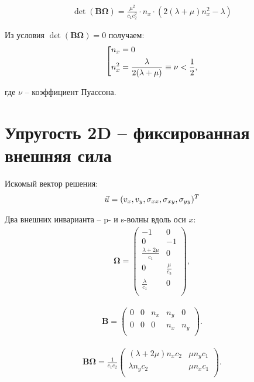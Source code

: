 \begin{eqnarray}
	\det (\mathbf{B} \mathbf{\Omega}) = \frac{\mu^{2}}{c_1 c^2_2} \cdot n_x \cdot (2 (\lambda + \mu) n^2_x - \lambda)
\end{eqnarray}

Из условия $\det (\mathbf{B} \mathbf{\Omega}) = 0$ получаем:
\begin{eqnarray}
\left[
\begin{gathered} 
	 n_x = 0  \hfill  \\
	 n^2_x = \frac{\lambda}{2(\lambda + \mu)} \equiv \nu < \frac{1}{2}, \hfill  \\
\end{gathered} 
\right.
\end{eqnarray}

где $\nu$ -- коэффициент Пуассона.


\section{Упругость 2D -- фиксированная внешняя сила}
Искомый вектор решения:
\begin{eqnarray}
	\vec{u}=(v_x,v_y,\sigma_{xx},\sigma_{xy},\sigma_{yy})^{\small{T}}
\end{eqnarray}

Два внешних инварианта -- p- и s-волны вдоль оси $x$:
\begin{align}
\label{outer_waves_elastic2d}
	\mathbf{\Omega} =
	\left( \begin{array}{cccccccccccc}
	-1 & 0   \\
	 0 & -1  \\
	\frac{\lambda+2\mu}{c_1} & 0 \\
	0 & \frac{\mu}{c_2} \\
	\frac{\lambda}{c_1} & 0 \\
	\end{array} \right),
\end{align} 

\begin{align}
	\mathbf{B} =
	\left( \begin{array}{cccccccccccc}
	 0 & 0 & n_x & n_y & 0 \\
	 0 & 0 & 0 & n_x & n_y \\
	\end{array} \right).
\end{align}

\begin{align}
	\mathbf{B} \mathbf{\Omega} = \frac{1}{c_1 c_2}
	\left( \begin{array}{cccccccccccc}
	 (\lambda + 2\mu) n_x c_2 & \mu n_y c_1    \\
	 \lambda n_y c_2          & \mu n_x c_1    \\
	\end{array} \right).
\end{align}

